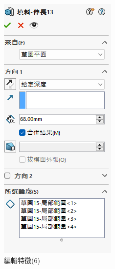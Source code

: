 \begin{figure}[h!]
\begin{minipage}[b]{0.35\textwidth}
        \includegraphics[width=\textwidth,height=0.35\textheight]{./../images/6-1-43} 
        \caption{編輯特徵(6)}
        \label{fig:feature1}
    \end{minipage}
\end{figure}

